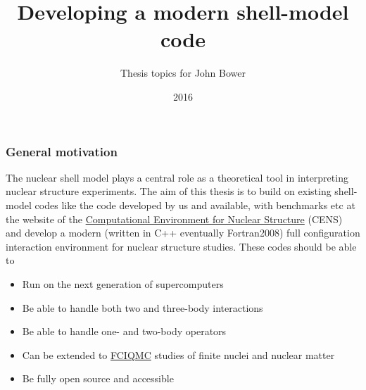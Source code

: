 \documentclass{beamer}
\begin{document}

\newcommand{\exercisesection}[1]{\subsection*{#1}}







\title{Developing a modern shell-model code}


\author{Thesis topics for John Bower}

\date{2016
}

\begin{frame}
\titlepage
\end{frame}

\begin{frame}
\frametitle{General motivation}

\begin{block}{}
The nuclear shell model 
plays a central role as a theoretical tool in interpreting nuclear
structure experiments. The aim of this thesis is to build on existing
shell-model codes like the code developed by us and available, with
benchmarks etc at the website of the \href{{https://github.com/ManyBodyPhysics/CENS}}{Computational Environment for
Nuclear Structure} (CENS)
and develop a modern (written in C++ eventually Fortran2008) full
configuration interaction environment for nuclear structure
studies. These codes should be able to 
\begin{itemize}
\item Run on the next generation of supercomputers 

\item Be able to handle both two and three-body interactions 

\item Be able to handle one- and two-body operators 

\item Can be extended to \href{{https://www.duo.uio.no/bitstream/handle/10852/37172/master.pdf?sequence=1}}{FCIQMC} studies of finite nuclei and nuclear matter

\item Be fully open source and accessible
\end{itemize}

\noindent
\end{block}
\end{frame}
\end{document}
